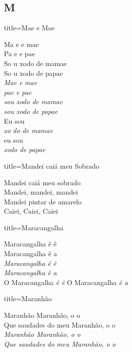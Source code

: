 \documentclass[fontsize=14pt, paper=a4, twoside, DIV=20]{scrreprt} %
\newcommand\chapTOC[1]{
    \chapter*{#1}
    \addcontentsline{toc}{chapter}{#1}
    \markboth{#1}{#1}}
\begin{document}
\begin{multicols*}{2}
\chapTOC{M}

\begin{song}{title={Mae e Mae}}
        \begin{verse*}
            Ma e e mae\\
            Pa e e pae\\
            So u xodo de mamae\\
            So u xodo de papae\\
            \textit{Mae e mae}\\
            \textit{pae e pae}\\
            \textit{sou xodo de mamae}\\
            \textit{sou xodo de papae}\\
            Eu sou\\
            \textit{xo}  \textit{do de mamae}\\
            eu sou\\
            \textit{xodo de papae}\\
        \end{verse*}
\end{song}

\begin{song}{title={Mandei caiá meu Sobrado}}
    \begin{verse*}
            Mandei caiá meu sobrado \\
            Mandei, mandei, mandei\\
            Mandei pintar de amarelo\\
            Caiei, Caiei, Caiei\\
    \end{verse*}
        
\end{song}

\begin{song}{title={Maracangalha}}
    \begin{verse*}
        Maracangalha ê ê \\
        Maracangalha ê a \\
        \textit{Maracangalha ê ê \\
        Maracangalha ê a \\}
        O Maracangalha
        \textit{ê ê}
        O Maracangalha
        \textit{ê a}


       
    \end{verse*}
\end{song}
\begin{song}{title={Maranhão}}
    \begin{verse*}
        Maranhão Maranhão, o o \\
        Que saudades do meu Maranhão, o o \\
        \textit{Maranhão Maranhão, o o \\
        Que saudades do meu Maranhão, o o \\}
    \end{verse*}
\end{song}


\end{multicols*}
\end{document}
